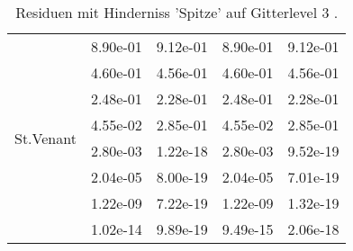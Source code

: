 \begin{table}
\begin{tabular}{c|cc|cc|}
\hline 
\multicolumn{1}{|c|}{\multirow{8}{*}{St.Venant}} &\multicolumn{1}{|c|}{  8.90e-01} & \multicolumn{1}{|c|}{  9.12e-01} & \multicolumn{1}{|c|}{  8.90e-01} & \multicolumn{1}{|c|}{  9.12e-01} \\ 
\multicolumn{1}{|c|}{} & \multicolumn{1}{|c|}{  4.60e-01} & \multicolumn{1}{|c|}{  4.56e-01} & \multicolumn{1}{|c|}{  4.60e-01} & \multicolumn{1}{|c|}{  4.56e-01} \\ 
\multicolumn{1}{|c|}{} & \multicolumn{1}{|c|}{  2.48e-01} & \multicolumn{1}{|c|}{  2.28e-01} & \multicolumn{1}{|c|}{  2.48e-01} & \multicolumn{1}{|c|}{  2.28e-01} \\ 
\multicolumn{1}{|c|}{} & \multicolumn{1}{|c|}{  4.55e-02} & \multicolumn{1}{|c|}{  2.85e-01} & \multicolumn{1}{|c|}{  4.55e-02} & \multicolumn{1}{|c|}{  2.85e-01} \\ 
\multicolumn{1}{|c|}{} & \multicolumn{1}{|c|}{  2.80e-03} & \multicolumn{1}{|c|}{  1.22e-18} & \multicolumn{1}{|c|}{  2.80e-03} & \multicolumn{1}{|c|}{  9.52e-19} \\ 
\multicolumn{1}{|c|}{} & \multicolumn{1}{|c|}{  2.04e-05} & \multicolumn{1}{|c|}{  8.00e-19} & \multicolumn{1}{|c|}{  2.04e-05} & \multicolumn{1}{|c|}{  7.01e-19} \\ 
\multicolumn{1}{|c|}{} & \multicolumn{1}{|c|}{  1.22e-09} & \multicolumn{1}{|c|}{  7.22e-19} & \multicolumn{1}{|c|}{  1.22e-09} & \multicolumn{1}{|c|}{  1.32e-19} \\ 
\multicolumn{1}{|c|}{} & \multicolumn{1}{|c|}{  1.02e-14} & \multicolumn{1}{|c|}{  9.89e-19} & \multicolumn{1}{|c|}{  9.49e-15} & \multicolumn{1}{|c|}{  2.06e-18} \\ 
\hline 
\end{tabular}\caption{Residuen mit Hinderniss 'Spitze' auf Gitterlevel 3 .}\label{tab:Residuum_Spitze_level3}
\end{table} 

